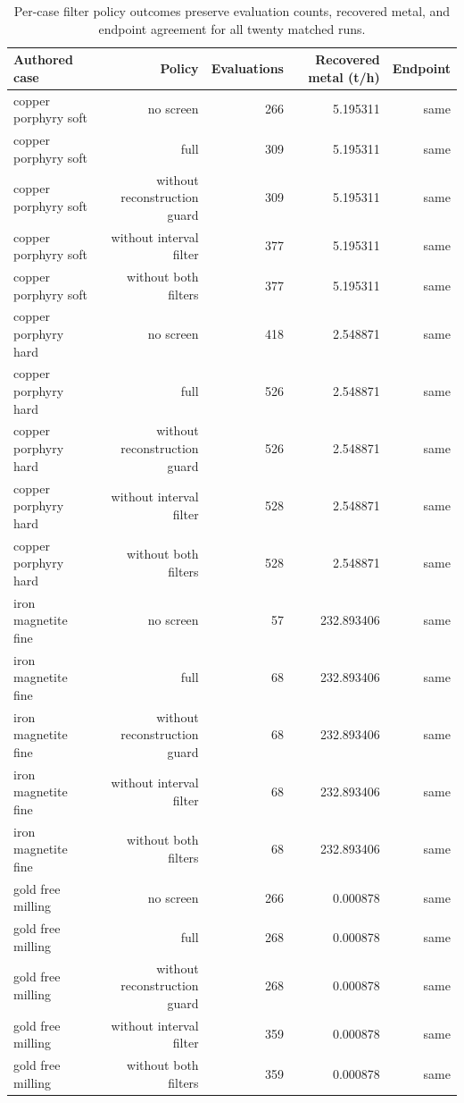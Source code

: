 \begin{table}[htbp]
\centering
\small
\caption{Per-case filter policy outcomes preserve evaluation counts, recovered metal, and endpoint agreement for all twenty matched runs.}
\label{tab:guard-cases}
\begin{tabular}{lrrrr}
\toprule
Authored case & Policy & Evaluations & Recovered metal (t/h) & Endpoint \\
\midrule
copper porphyry soft & no screen & 266 & 5.195311 & same \\
copper porphyry soft & full & 309 & 5.195311 & same \\
copper porphyry soft & without reconstruction guard & 309 & 5.195311 & same \\
copper porphyry soft & without interval filter & 377 & 5.195311 & same \\
copper porphyry soft & without both filters & 377 & 5.195311 & same \\
copper porphyry hard & no screen & 418 & 2.548871 & same \\
copper porphyry hard & full & 526 & 2.548871 & same \\
copper porphyry hard & without reconstruction guard & 526 & 2.548871 & same \\
copper porphyry hard & without interval filter & 528 & 2.548871 & same \\
copper porphyry hard & without both filters & 528 & 2.548871 & same \\
iron magnetite fine & no screen & 57 & 232.893406 & same \\
iron magnetite fine & full & 68 & 232.893406 & same \\
iron magnetite fine & without reconstruction guard & 68 & 232.893406 & same \\
iron magnetite fine & without interval filter & 68 & 232.893406 & same \\
iron magnetite fine & without both filters & 68 & 232.893406 & same \\
gold free milling & no screen & 266 & 0.000878 & same \\
gold free milling & full & 268 & 0.000878 & same \\
gold free milling & without reconstruction guard & 268 & 0.000878 & same \\
gold free milling & without interval filter & 359 & 0.000878 & same \\
gold free milling & without both filters & 359 & 0.000878 & same \\
\bottomrule
\end{tabular}
\end{table}
